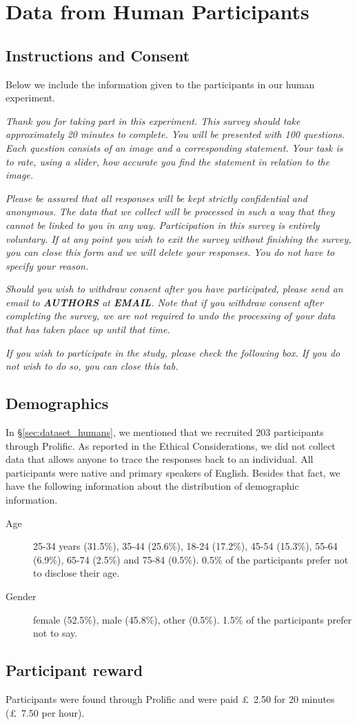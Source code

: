\section{Data from Human Participants}

\subsection{Instructions and Consent}
Below we include the information given to the participants in our human experiment.

\textit{Thank you for taking part in this experiment. This survey should take approximately 20 minutes to complete. You will be presented with 100 questions. Each question consists of an image and a corresponding statement. Your task is to rate, using a slider, how accurate you find the statement in relation to the image.}

\textit{Please be assured that all responses will be kept strictly confidential and anonymous. The data that we collect will be processed in such a way that they cannot be linked to you in any way. Participation in this survey is entirely voluntary. If at any point you wish to exit the survey without finishing the survey, you can close this form and we will delete your responses. You do not have to specify your reason.}

\textit{Should you wish to withdraw consent after you have participated, please send an email to \textup{\textbf{AUTHORS}} at \textup{\textbf{EMAIL}}. Note that if you withdraw consent after completing the survey, we are not required to undo the processing of your data that has taken place up until that time.
}

\textit{If you wish to participate in the study, please check the following box. If you do not wish to do so, you can close this tab.}

\subsection{Demographics}
In \S\ref{sec:dataset_humans}, we mentioned that we recruited 203 participants through Prolific.
As reported in the Ethical Considerations, we did not collect data that allows anyone to trace the responses back to an individual.
All participants were native and primary speakers of English.
Besides that fact, we have the following information about the distribution of demographic information.

\begin{description}
    \item[Age] 25-34 years (31.5\%), 35-44 (25.6\%), 18-24  (17.2\%), 45-54 (15.3\%), 55-64 (6.9\%), 65-74 (2.5\%) and 75-84 (0.5\%). 0.5\% of the participants prefer not to disclose their age.

    \item[Gender] female (52.5\%), male (45.8\%), other (0.5\%). 1.5\% of the participants prefer not to say.
\end{description}

\subsection{Participant reward}
Participants were found through Prolific and were paid \pounds\ 2.50 for 20 minutes (\pounds\ 7.50 per hour).
